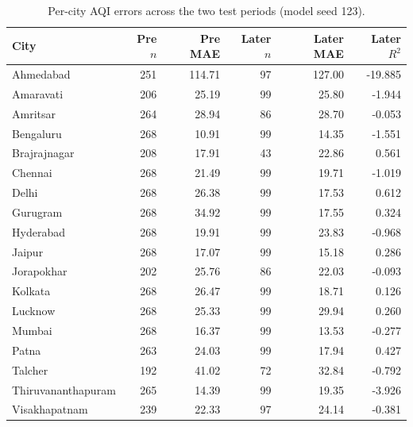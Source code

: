 \begin{table}[!htbp]
\centering
\caption{Per-city AQI errors across the two test periods (model seed 123).}\label{tab:cityperiods}
\setlength{\tabcolsep}{4pt}
\begin{tabular}{lrrrrr}
\toprule
City & Pre $n$ & Pre MAE & Later $n$ & Later MAE & Later $R^2$ \\
\midrule
Ahmedabad & 251 & 114.71 & 97 & 127.00 & -19.885 \\
Amaravati & 206 & 25.19 & 99 & 25.80 & -1.944 \\
Amritsar & 264 & 28.94 & 86 & 28.70 & -0.053 \\
Bengaluru & 268 & 10.91 & 99 & 14.35 & -1.551 \\
Brajrajnagar & 208 & 17.91 & 43 & 22.86 & 0.561 \\
Chennai & 268 & 21.49 & 99 & 19.71 & -1.019 \\
Delhi & 268 & 26.38 & 99 & 17.53 & 0.612 \\
Gurugram & 268 & 34.92 & 99 & 17.55 & 0.324 \\
Hyderabad & 268 & 19.91 & 99 & 23.83 & -0.968 \\
Jaipur & 268 & 17.07 & 99 & 15.18 & 0.286 \\
Jorapokhar & 202 & 25.76 & 86 & 22.03 & -0.093 \\
Kolkata & 268 & 26.47 & 99 & 18.71 & 0.126 \\
Lucknow & 268 & 25.33 & 99 & 29.94 & 0.260 \\
Mumbai & 268 & 16.37 & 99 & 13.53 & -0.277 \\
Patna & 263 & 24.03 & 99 & 17.94 & 0.427 \\
Talcher & 192 & 41.02 & 72 & 32.84 & -0.792 \\
Thiruvananthapuram & 265 & 14.39 & 99 & 19.35 & -3.926 \\
Visakhapatnam & 239 & 22.33 & 97 & 24.14 & -0.381 \\
\bottomrule
\end{tabular}
\end{table}
